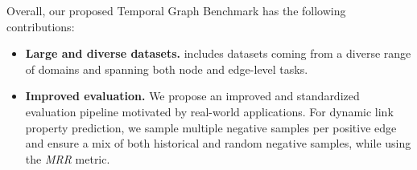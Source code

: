 Overall, our proposed Temporal Graph Benchmark has the following contributions: 
\begin{itemize}
    \item \textbf{Large and diverse datasets.} \name includes datasets coming from a diverse range of domains and spanning both node and edge-level tasks. 
    

    \item \textbf{Improved evaluation.} We propose an improved and standardized evaluation pipeline motivated by real-world applications. For dynamic link property prediction, we sample multiple negative samples per positive edge and ensure a mix of both historical and random negative samples, while using the \emph{MRR} metric. 
    

    

\end{itemize}
